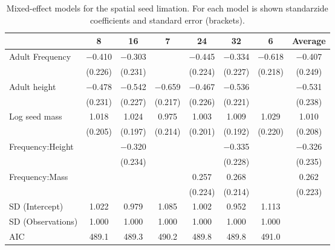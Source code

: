 \begin{table}

\caption{Mixed-effect models for the spatial seed limation. For each model is shown standarzide coefficients and standard error (brackets).}
\centering
\begin{tabular}[t]{lccccccc}
\toprule
  & 8 & 16 & 7 & 24 & 32 & 6 & Average\\
\midrule
Adult Frequency & \num{-0.410} & \num{-0.303} &  & \num{-0.445} & \num{-0.334} & \num{-0.618} & \num{-0.407}\\
 & (\num{0.226}) & (\num{0.231}) &  & (\num{0.224}) & (\num{0.227}) & (\num{0.218}) & (\num{0.249})\\
Adult height & \num{-0.478} & \num{-0.542} & \num{-0.659} & \num{-0.467} & \num{-0.536} &  & \num{-0.531}\\
 & (\num{0.231}) & (\num{0.227}) & (\num{0.217}) & (\num{0.226}) & (\num{0.221}) &  & (\num{0.238})\\
Log seed mass & \num{1.018} & \num{1.024} & \num{0.975} & \num{1.003} & \num{1.009} & \num{1.029} & \num{1.010}\\
 & (\num{0.205}) & (\num{0.197}) & (\num{0.214}) & (\num{0.201}) & (\num{0.192}) & (\num{0.220}) & (\num{0.208})\\
Frequency:Height &  & \num{-0.320} &  &  & \num{-0.335} &  & \num{-0.326}\\
 &  & (\num{0.234}) &  &  & (\num{0.228}) &  & (\num{0.235})\\
Frequency:Mass &  &  &  & \num{0.257} & \num{0.268} &  & \num{0.262}\\
 &  &  &  & (\num{0.224}) & (\num{0.214}) &  & (\num{0.223})\\
SD (Intercept) & \num{1.022} & \num{0.979} & \num{1.085} & \num{1.002} & \num{0.952} & \num{1.113} & \\
SD (Observations) & \num{1.000} & \num{1.000} & \num{1.000} & \num{1.000} & \num{1.000} & \num{1.000} & \\
\midrule
AIC & \num{489.1} & \num{489.3} & \num{490.2} & \num{489.8} & \num{489.8} & \num{491.0} & \\
\bottomrule
\end{tabular}
\end{table}

